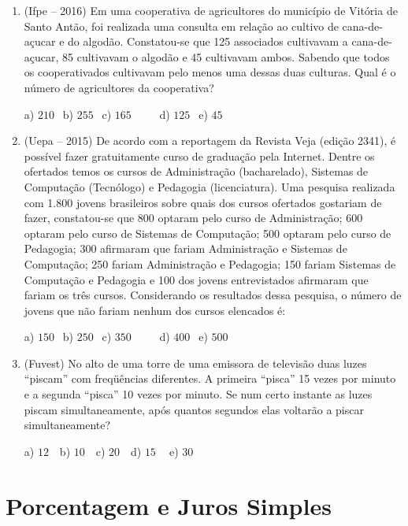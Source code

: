 \begin{multicols*}{2}
\begin{enumerate}
\begin{enumerate}
		\end{enumerate}

	\item (Ifpe – 2016) Em uma cooperativa de agricultores do município de Vitória de Santo Antão, foi realizada uma consulta em relação ao cultivo de cana-de-açucar e do algodão. Constatou-se que 125 associados cultivavam a cana-de-açucar, 85 cultivavam o algodão e 45 cultivavam ambos. Sabendo que todos os cooperativados cultivavam pelo menos uma dessas duas culturas. Qual é o número de agricultores da cooperativa? 
	
		a) $210 \ \ $ b) $255 \ \ $ c) $165 \ \ \ \ \ \ \ \ \ \ $ d) $125 \ \ $ e) $45 \ \ $

	\item (Uepa – 2015) De acordo com a reportagem da Revista Veja (edição 2341), é possível fazer gratuitamente curso de graduação pela Internet. Dentre os ofertados temos os cursos de Administração (bacharelado), Sistemas de Computação (Tecnólogo) e Pedagogia (licenciatura). Uma pesquisa realizada com 1.800 jovens brasileiros sobre quais dos cursos ofertados gostariam de fazer, constatou-se que 800 optaram pelo curso de Administração; 600 optaram pelo curso de Sistemas de Computação; 500 optaram pelo curso de Pedagogia; 300 afirmaram que fariam Administração e Sistemas de Computação; 250 fariam Administração e Pedagogia; 150 fariam Sistemas de Computação e Pedagogia e 100 dos jovens entrevistados afirmaram que fariam os três cursos. Considerando os resultados dessa pesquisa, o número de jovens que não fariam nenhum dos cursos elencados é: 
		
		a) $150 \ \ $ b) $250 \ \ $ c) $350 \ \ \ \ \ \ \ \ \ \ $ d) $400 \ \ $ e) $500 \ \ $		
		
	\item (Fuvest) No alto de uma torre de uma emissora de televisão duas luzes “piscam” com freqüências diferentes. A primeira “pisca” 15 vezes por minuto e a segunda “pisca” 10 vezes por minuto. Se num certo instante as luzes piscam simultaneamente, após quantos segundos elas voltarão a piscar simultaneamente? 
		
		a) $12 \ \ \ $ b) $10 \ \ \ $ c) $20 \ \ \ $ d) $15 \ \ \ \ $ e) $30 \ \ $

	\end{enumerate}

        \section*{Porcentagem e Juros Simples}
        

\end{multicols*}
